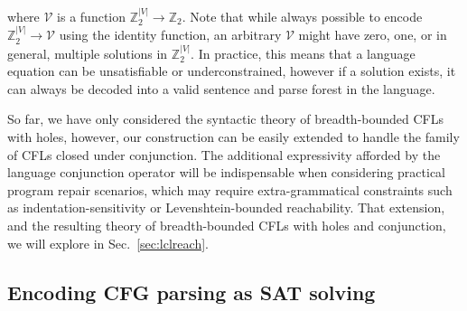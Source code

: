 \documentclass[sigplan,review,anonymous,acmsmall]{acmart}\settopmatter{printfolios=false,printccs=false,printacmref=false}
\begin{document}
\noindent where $\mathcal{V}$ is a function $\mathbb{Z}_2^{|V|}\rightarrow\mathbb{Z}_2$. Note that while always possible to encode $\mathbb{Z}_2^{|V|} \rightarrow \mathcal{V}$ using the identity function, an arbitrary $\mathcal{V}$ might have zero, one, or in general, multiple solutions in $\mathbb{Z}_2^{|V|}$. In practice, this means that a language equation can be unsatisfiable or underconstrained, however if a solution exists, it can always be decoded into a valid sentence and parse forest in the language.

So far, we have only considered the syntactic theory of breadth-bounded CFLs with holes, however, our construction can be easily extended to handle the family of CFLs closed under conjunction. The additional expressivity afforded by the language conjunction operator will be indispensable when considering practical program repair scenarios, which may require extra-grammatical constraints such as indentation-sensitivity or Levenshtein-bounded reachability. That extension, and the resulting theory of breadth-bounded CFLs with holes and conjunction, we will explore in Sec.~\ref{sec:lclreach}.

\pagebreak\subsection{Encoding CFG parsing as SAT solving}\label{sec:sat}

\begin{figure}[H]
\end{figure}
\end{document}
